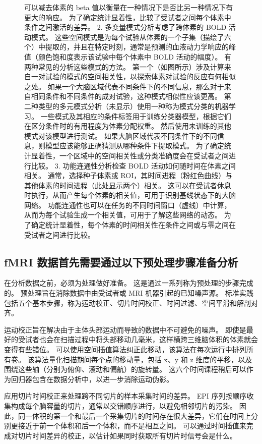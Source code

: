 \begin{figure}[htbp]
{		可以减去体素的 beta 值以衡量在一种情况下是否比另一种情况下有更大的响应。 
		为了确定统计显着性，比较了受试者之间每个体素中条件之间激活的差异。 
		2. 多变量模式分析考虑了跨体素的 BOLD 活动模式。 
		这些空间模式是为每个试验从体素的一个子集（描绘了六个）中提取的，并且在特定时刻，通常是预测的血液动力学响应的峰值（颜色饱和度表示该试验中每个体素中 BOLD 活动的幅度）。 有两种常见的分析这些模式的方法。 
		第一个（如图所示）涉及计算来自一对试验的模式的空间相关性，以探索体素对试验的反应有何相似之处。 
		如果一个大脑区域代表不同条件下的不同信息，那么对于来自相同条件和不同条件的成对试验，这种模式相似性应该更高。 
		第二种类型的多元模式分析（未显示）使用一种称为模式分类的机器学习。 
		一些模式及其相应的条件标签用于训练分类器模型，根据它们在区分条件时的有用程度为体素分配权重。 
		然后使用未训练的其他模式对该模型进行测试。 
		如果大脑区域代表不同条件下的不同信息，则模型应该能够正确猜测从哪种条件下提取模式。 
		为了确定统计显着性，一个区域中的空间相关性或分类准确度会在受试者之间进行比较。 
		3. 功能连通性分析检查 BOLD 活动如何随时间在体素之间相关。 
		通常，选择种子体素或 ROI，其时间进程（粉红色曲线）与其他体素的时间进程（此处显示两个）相关。 
		这可以在受试者休息时执行，从而产生每个体素的相关值，可用于识别基线状态下的大脑网络。 
		功能连通性也可以在任务的不同时间窗口（虚线）中计算，从而为每个试验生成一个相关值，可用于了解这些网络的动态。 
		为了确定统计显着性，每个体素的时间相关性在条件之间或与零之间在受试者之间进行比较。}
	\label{fig:6_2}
\end{figure}


\subsection{fMRI 数据首先需要通过以下预处理步骤准备分析}
在分析数据之前，必须为处理做好准备。 
这是通过一系列称为预处理的步骤完成的。 
预处理旨在消除数据中由受试者或 MRI 机器引起的已知噪声源。 
标准实践包括五个基本步骤，称为运动校正、切片时间校正、时间过滤、空间平滑和解剖对齐。

运动校正旨在解决由于主体头部运动而导致的数据中不可避免的噪声。 
即使是最好的受试者也会在扫描过程中将头部移动几毫米，这样横跨三维脑体积的体素就会变得有些错位。 
可以使用空间插值算法纠正此移动，该算法在每次运行中排列所有卷。 
该算法量化扫描期间每个点的移动量，包括 x、y 和 z 维度的平移，以及围绕这些轴（分别为俯仰、滚动和偏航）的旋转量。 
这六个时间课程稍后可以作为回归器包含在数据分析中，以进一步消除运动伪影。


应用切片时间校正来处理跨不同切片的样本采集时间的差异。 
EPI 序列按顺序收集构成每个脑容量的切片，通常以交错顺序进行，以避免相邻切片的污染。 
因此，同一体积的第一个和最后一个采集切片的时间存在很大差异，它们在时间上分别更接近于前一个体积和后一个体积，而不是相互之间。 
可以通过时间插值来完成对切片时间差异的校正，以估计如果同时获取所有切片时信号会是什么。


